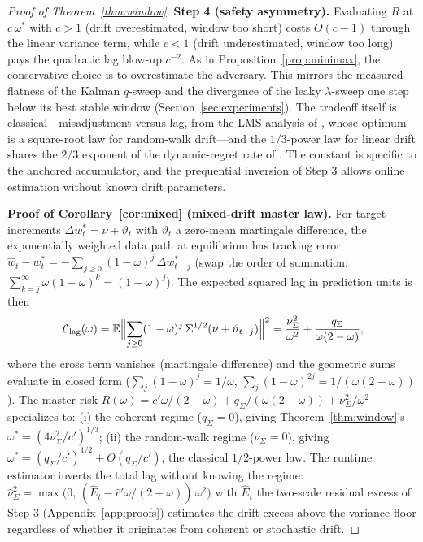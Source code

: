 \begin{proof}[Proof of Theorem~\ref{thm:window}]
\textbf{Step 4 (safety asymmetry).}
Evaluating $R$ at $c\,\omega^*$ with $c > 1$ (drift overestimated, window too short) costs $O(c - 1)$ through the linear variance term, while $c < 1$ (drift underestimated, window too long) pays the quadratic lag blow-up $c^{-2}$.
As in Proposition~\ref{prop:minimax}, the conservative choice is to overestimate the adversary.
This mirrors the measured flatness of the Kalman $q$-sweep and the divergence of the leaky $\lambda$-sweep one step below its best stable window (Section~\ref{sec:experiments}).
The tradeoff itself is classical---misadjustment versus lag, from the LMS analysis of \citet{widrow1976}, whose optimum is a square-root law for random-walk drift---and the $1/3$-power law for linear drift shares the $2/3$ exponent of the dynamic-regret rate of \citet{besbes2015}. The constant is specific to the anchored accumulator, and the prequential inversion of Step 3 allows online estimation without known drift parameters.

\medskip
\noindent\textbf{Proof of Corollary~\ref{cor:mixed} (mixed-drift master law).}
For target increments $\Delta w^*_t = \nu + \vartheta_t$ with $\vartheta_t$ a zero-mean martingale difference, the exponentially weighted data path at equilibrium has tracking error $\widehat w_t - w^*_t = -\sum_{j \ge 0}(1-\omega)^j\,\Delta w^*_{t-j}$ (swap the order of summation: $\sum_{k=j}^{\infty} \omega(1-\omega)^k = (1-\omega)^j$).
The expected squared lag in prediction units is then
\[
  \mathcal{L}_{\mathrm{lag}}(\omega) = \mathbb{E}\Bigl\|\sum_{j \ge 0}(1-\omega)^j\,\Sigma^{1/2}(\nu + \vartheta_{t-j})\Bigr\|^2
  = \frac{\nu^2_\Sigma}{\omega^2} + \frac{q_\Sigma}{\omega(2-\omega)},
\]
where the cross term vanishes (martingale difference) and the geometric sums evaluate in closed form ($\sum_j (1-\omega)^j = 1/\omega$, $\sum_j (1-\omega)^{2j} = 1/(\omega(2-\omega))$).
The master risk $R(\omega) = c' \omega/(2-\omega) + q_\Sigma/(\omega(2-\omega)) + \nu^2_\Sigma/\omega^2$ specializes to: (i) the coherent regime ($q_\Sigma = 0$), giving Theorem~\ref{thm:window}'s $\omega^* = (4\nu^2_\Sigma/c')^{1/3}$; (ii) the random-walk regime ($\nu_\Sigma = 0$), giving $\omega^* = (q_\Sigma/c')^{1/2} + O(q_\Sigma/c')$, the classical $1/2$-power law.
The runtime estimator inverts the total lag without knowing the regime: $\widehat\nu^2_\Sigma = \max\bigl(0,\,(\widehat E_t - \hat c' \omega/(2-\omega))\,\omega^2\bigr)$ with $\widehat E_t$ the two-scale residual excess of Step 3 (Appendix~\ref{app:proofs}) estimates the drift excess above the variance floor regardless of whether it originates from coherent or stochastic drift.


\end{proof}
